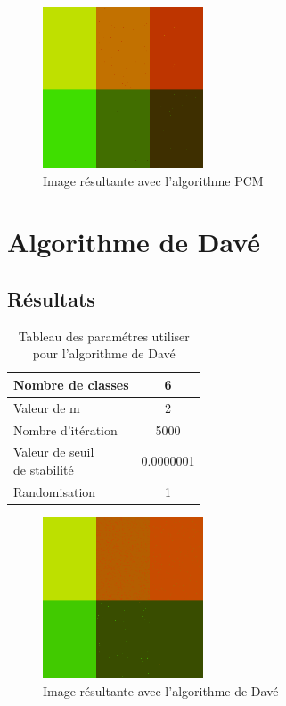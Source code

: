 \documentclass[a4paper,11pt]{article}
\begin{document}
\begin{figure}[H]
  \begin{center} 
    \includegraphics[width=180px]{../img/segHCM.png}
    \caption{Image résultante avec l'algorithme PCM}
  \end{center}
\end{figure}

\section{Algorithme de Davé}

\subsection{Résultats}

\begin{table}[H]
  \begin{center}
    \begin{tabular}{|l|c|}
      \hline
      Nombre de classes & 6 \\
      \hline
      Valeur de m & 2 \\
      \hline
      Nombre d'itération & 5000 \\
      \hline
      \shortstack{ Valeur de seuil \\ de stabilité }  & 0.0000001 \\
      \hline
      Randomisation & 1 \\
      \hline
    \end{tabular}
    \caption{Tableau des paramétres utiliser pour l'algorithme de Davé}
  \end{center}
\end{table}


\begin{figure}[H]
  \begin{center} 
    \includegraphics[width=180px]{../img/segDave.png}
    \caption{Image résultante avec l'algorithme de Davé}
  \end{center}
\end{figure}
\end{document}
